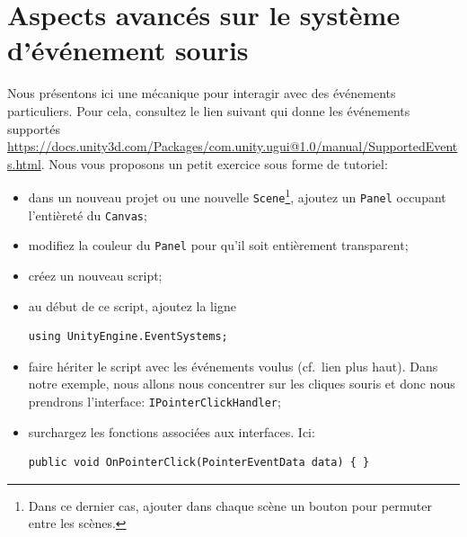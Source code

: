 \documentclass[a4paper,10pt]{article}
\begin{document}
\section{Aspects avancés sur le système d'événement souris}

Nous présentons ici une mécanique pour interagir avec des événements particuliers. Pour cela, consultez le lien suivant qui donne les événements supportés \url{https://docs.unity3d.com/Packages/com.unity.ugui@1.0/manual/SupportedEvents.html}. Nous vous proposons un petit exercice sous forme de tutoriel:
\begin{itemize}
	\item dans un nouveau projet ou une nouvelle \texttt{Scene}\footnote{Dans ce dernier cas, ajouter dans chaque scène un bouton pour permuter entre les scènes.}, ajoutez un \texttt{Panel} occupant l'entièreté du \texttt{Canvas};
	\item modifiez la couleur du \texttt{Panel} pour qu'il soit entièrement transparent;
	\item créez un nouveau script;
	\item au début de ce script, ajoutez la ligne
\begin{lstlisting}
using UnityEngine.EventSystems;	
\end{lstlisting}	
	\item faire hériter le script avec les événements voulus (cf.~lien plus haut). Dans notre exemple, nous allons nous concentrer sur les cliques souris et donc nous prendrons l'interface: \texttt{IPointerClickHandler};
	\item surchargez les fonctions associées aux interfaces. Ici: 
\begin{lstlisting}
public void OnPointerClick(PointerEventData data) { }
\end{lstlisting}		
\end{itemize}
\end{document}
